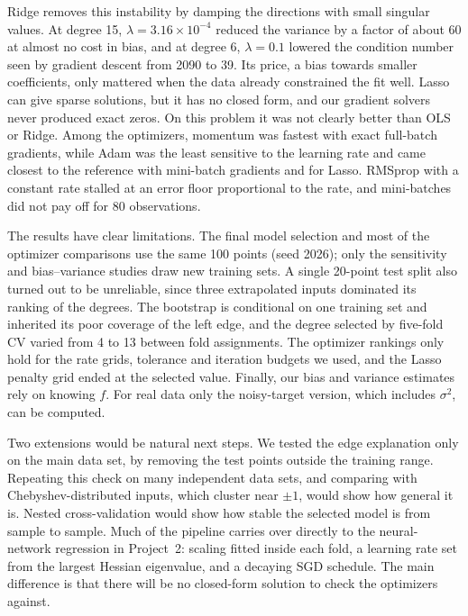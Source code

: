 \documentclass[aps,prb,reprint,superscriptaddress,nofootinbib,longbibliography,floatfix]{revtex4-2}
\begin{document}
Ridge removes this instability by damping the directions with small singular values. At degree 15, $\lambda=3.16\times10^{-4}$ reduced the variance by a factor of about 60 at almost no cost in bias, and at degree 6, $\lambda=0.1$ lowered the condition number seen by gradient descent from 2090 to 39. Its price, a bias towards smaller coefficients, only mattered when the data already constrained the fit well. Lasso can give sparse solutions, but it has no closed form, and our gradient solvers never produced exact zeros. On this problem it was not clearly better than OLS or Ridge. Among the optimizers, momentum was fastest with exact full-batch gradients, while Adam was the least sensitive to the learning rate and came closest to the reference with mini-batch gradients and for Lasso. RMSprop with a constant rate stalled at an error floor proportional to the rate, and mini-batches did not pay off for 80 observations.

The results have clear limitations. The final model selection and most of the optimizer comparisons use the same 100 points (seed 2026); only the sensitivity and bias--variance studies draw new training sets. A single 20-point test split also turned out to be unreliable, since three extrapolated inputs dominated its ranking of the degrees. The bootstrap is conditional on one training set and inherited its poor coverage of the left edge, and the degree selected by five-fold CV varied from 4 to 13 between fold assignments. The optimizer rankings only hold for the rate grids, tolerance and iteration budgets we used, and the Lasso penalty grid ended at the selected value. Finally, our bias and variance estimates rely on knowing $f$. For real data only the noisy-target version, which includes $\sigma^2$, can be computed.

Two extensions would be natural next steps. We tested the edge explanation only on the main data set, by removing the test points outside the training range. Repeating this check on many independent data sets, and comparing with Chebyshev-distributed inputs, which cluster near $\pm1$, would show how general it is. Nested cross-validation would show how stable the selected model is from sample to sample. Much of the pipeline carries over directly to the neural-network regression in Project~2: scaling fitted inside each fold, a learning rate set from the largest Hessian eigenvalue, and a decaying SGD schedule. The main difference is that there will be no closed-form solution to check the optimizers against.

\appendix
\end{document}

